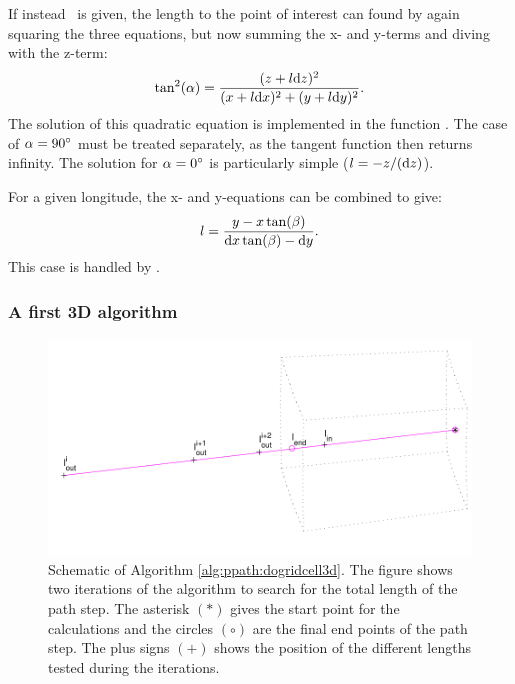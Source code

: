 If instead \Lat\ is given, the length to the point of interest can found by
again squaring the three equations, but now summing the x- and y-terms
and diving with the z-term:
\begin{equation}
  \tan^2(\alpha) = \frac{(z+l\mathrm{d} z)^2}{(x+l\mathrm{d} x)^2+(y+l\mathrm{d} y)^2}.
\end{equation}
The solution of this quadratic equation is implemented in the function
. The case of $\alpha=90^\circ$ must be treated
separately, as the tangent function then returns infinity. The solution for 
$\alpha=0^\circ$ is particularly simple ($l=-z/(\mathrm{d} z)$).

For a given longitude, the x- and y-equations can be combined to give:
\begin{equation}
  l = \frac{y-x\tan(\beta)}{\mathrm{d} x\tan(\beta)-\mathrm{d} y}.
\end{equation}
This case is handled by .



\subsubsection{A first 3D algorithm}
\label{sec:ppath:3dgeom}

\begin{figure}
 \begin{center}
  \includegraphics*[width=0.80\hsize]{ppath_3Dsearch}
  \caption{Schematic of Algorithm \ref{alg:ppath:dogridcell3d}. The
    figure shows two iterations of the algorithm to search for the
    total length of the path step. The asterisk $(\ast)$ gives the
    start point for the calculations and the circles $(\circ)$ are the
    final end points of the path step. The plus signs $(+)$ shows the
    position of the different lengths tested during the iterations.}
  \label{fig:ppath:3Dsearch}  
 \end{center}
\end{figure}

